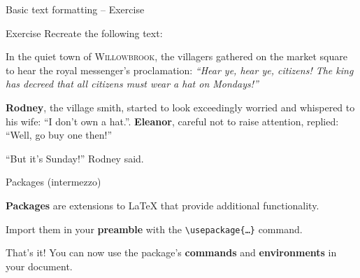 \documentclass{beamer}
\newcommand{\command}[2]{\texttt{\textbackslash#1\{#2\}}}
\begin{document}
\begin{frame}{Basic text formatting -- Exercise}

    \begin{block}{Exercise}
        Recreate the following text:

        \bigskip

        \rmfamily
        \hspace{20pt}In the quiet town of \textsc{Willowbrook}, the villagers gathered on the market square to hear the royal messenger's proclamation: \textit{\Large``Hear ye, hear ye, citizens! The king has decreed that all citizens must wear a hat on Mondays!''}

        \medskip

        \hspace{20pt}\textbf{Rodney}, the village smith, started to look exceedingly worried and whispered to his wife: {\footnotesize``I don't own a hat.''}. \textbf{Eleanor}, careful not to raise attention, replied: {\footnotesize``Well, go buy one then!''}

        \medskip

        \hspace{20pt}``But it's Sunday!'' Rodney said.
    \end{block}
\end{frame}

\begin{frame}{Packages (intermezzo)}

    \textbf{Packages} are extensions to \LaTeX{} that provide additional functionality.

    \bigskip

    Import them in your \textbf{preamble} with the \command{usepackage}{\ldots} command.

    \bigskip

    That's it! You can now use the package's \textbf{commands} and \textbf{environments} in your document.

\end{frame}
\end{document}

